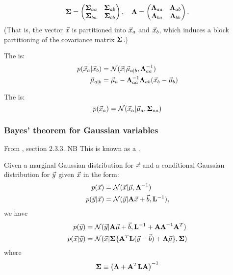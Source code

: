 \documentclass[11pt]{article}
\begin{document}
\begin{appendices}
\begin{equation}
  \boldsymbol{\Sigma} =
  \left(
    \begin{matrix}
      \boldsymbol{\Sigma}_{aa} & \boldsymbol{\Sigma}_{ab} \\
      \boldsymbol{\Sigma}_{ba} & \boldsymbol{\Sigma}_{bb}
    \end{matrix}
  \right)
  , \quad
  \boldsymbol{\Lambda} =
  \left(
    \begin{matrix}
      \boldsymbol{\Lambda}_{aa} & \boldsymbol{\Lambda}_{ab} \\
      \boldsymbol{\Lambda}_{ba} & \boldsymbol{\Lambda}_{bb}
    \end{matrix}
  \right).
\end{equation}
(That is, the vector $\vec{x}$ is partitioned into $\vec{x}_a$ and $\vec{x}_b$, which
induces a block partitioning of the covariance matrix $\boldsymbol{\Sigma}$.)

The  is:
\begin{align}
  p(\vec{x}_a | \vec{x}_b) &= \mathcal{N}(\vec{x} | \vec{\mu}_{a | b},
                         \boldsymbol{\Lambda}_{aa}^{-1}) \nonumber\\
  \vec{\mu}_{a | b}      &= \vec{\mu}_a - \boldsymbol{\Lambda}_{aa}^{-1} \boldsymbol{\Lambda}_{ab}
                         (\vec{x}_b - \vec{\mu}_b)   \label{eq:gauss_part_cond} 
\end{align}

The  is:
\begin{equation}
  p(\vec{x}_a) = \mathcal{N}(\vec{x}_a | \vec{\mu}_a, \boldsymbol{\Sigma}_{aa}) \label{eq:gauss_part_marg} 
\end{equation}

\subsubsection{Bayes' theorem for Gaussian variables}
From \cite{BISHOP}, section 2.3.3. NB This is known as a .

Given a marginal Gaussian distribution for $\vec{x}$ and a conditional Gaussian
distribution for $\vec{y}$ given $\vec{x}$ in the form:
\begin{align}
  p(\vec{x})       &= \mathcal{N}(\vec{x} | \vec{\mu}, \boldsymbol{\Lambda}^{-1}) \\
  p(\vec{y}|\vec{x}) &= \mathcal{N}(\vec{y} | \mathbf{A} \vec{x} + \vec{b}, \mathbf{L}^{-1}),
\end{align}
we have
\begin{align}
  p(\vec{y})       &= \mathcal{N} (\vec{y} |\mathbf{A} \vec{\mu} + \vec{b}, \mathbf{L}^{-1}
                   + \mathbf{A} \boldsymbol{\Lambda}^{-1} \mathbf{A}^T )   \label{eq:gauss_bayes_marg} \\
  p(\vec{x}|\vec{y}) &= \mathcal{N} ( \vec{x} | \boldsymbol{\Sigma} \{ \mathbf{A}^T \mathbf{L}
                   (\vec{y} - \vec{b}) + \boldsymbol{\Lambda} \vec{\mu} \},
                   \boldsymbol{\Sigma})   \label{eq:gauss_bayes_cond} 
\end{align}
where
\begin{equation}
  \boldsymbol{\Sigma} \equiv \left(\boldsymbol{\Lambda} + \mathbf{A}^T \mathbf{L} \mathbf{A} \right)^{-1}
\end{equation}



\end{appendices}
\end{document}
